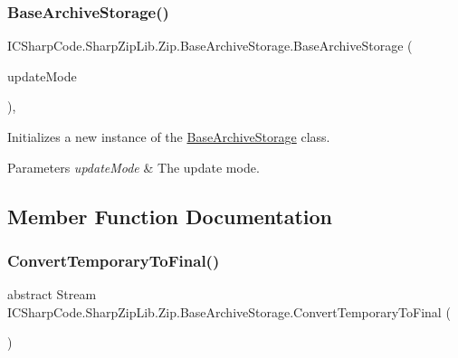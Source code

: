 \subsubsection{\texorpdfstring{Base\+Archive\+Storage()}{BaseArchiveStorage()}}
{\footnotesize\ttfamily I\+C\+Sharp\+Code.\+Sharp\+Zip\+Lib.\+Zip.\+Base\+Archive\+Storage.\+Base\+Archive\+Storage (\begin{DoxyParamCaption}\item[{\hyperlink{namespace_i_c_sharp_code_1_1_sharp_zip_lib_1_1_zip_a626313bc452203ca2bdb092947541027}{File\+Update\+Mode}}]{update\+Mode }\end{DoxyParamCaption})\hspace{0.3cm}{\ttfamily [inline]}, {\ttfamily [protected]}}



Initializes a new instance of the \hyperlink{class_i_c_sharp_code_1_1_sharp_zip_lib_1_1_zip_1_1_base_archive_storage}{Base\+Archive\+Storage} class. 


\begin{DoxyParams}{Parameters}
{\em update\+Mode} & The update mode.\\
\hline
\end{DoxyParams}


\subsection{Member Function Documentation}
\mbox{\label{class_i_c_sharp_code_1_1_sharp_zip_lib_1_1_zip_1_1_base_archive_storage_ab20872fd7a5c31f1765bc36f3a37040f}} 
\subsubsection{\texorpdfstring{Convert\+Temporary\+To\+Final()}{ConvertTemporaryToFinal()}}
{\footnotesize\ttfamily abstract Stream I\+C\+Sharp\+Code.\+Sharp\+Zip\+Lib.\+Zip.\+Base\+Archive\+Storage.\+Convert\+Temporary\+To\+Final (\begin{DoxyParamCaption}{ }\end{DoxyParamCaption})\hspace{0.3cm}{\ttfamily [pure virtual]}}



